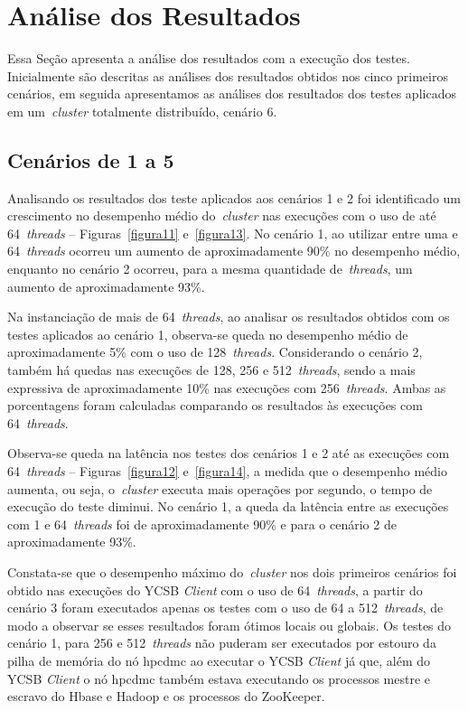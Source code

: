 \documentclass[12pt]{article}
\begin{document}
\section{Análise dos Resultados}
\label{sec:resultados}

Essa Seção apresenta a análise dos resultados com a execução dos testes. Inicialmente são descritas as análises dos resultados obtidos nos cinco primeiros cenários, em seguida apresentamos as análises dos resultados dos testes aplicados em um~\emph{cluster} totalmente distribuído, cenário 6.

\subsection{Cenários de 1 a 5}

Analisando os resultados dos teste aplicados aos cenários 1 e 2 foi identificado um crescimento no desempenho médio do~\emph{cluster} nas execuções com o uso de até 64~\emph{threads} -- Figuras~\ref{figura11} e~\ref{figura13}. 
No cenário 1, ao utilizar entre uma e 64~\emph{threads} ocorreu um aumento de aproximadamente 90\% no desempenho médio, enquanto no cenário 2 ocorreu, para a mesma quantidade de~\emph{threads}, um aumento de aproximadamente 93\%.

Na instanciação de mais de 64~\emph{threads}, ao analisar os resultados obtidos com os testes aplicados ao cenário 1, observa-se queda no desempenho médio de aproximadamente 5\% com o uso de 128~\emph{threads}. Considerando o cenário 2, também há quedas nas execuções de 128, 256 e 512~\emph{threads}, sendo a mais expressiva de aproximadamente 10\% nas execuções com 256~\emph{threads}. 
Ambas as porcentagens foram calculadas comparando os resultados às execuções com 64~\emph{threads}.

Observa-se queda na latência nos testes dos cenários 1 e 2 até as execuções com 64~\emph{threads} -- Figuras~\ref{figura12} e~\ref{figura14}, a medida que o desempenho médio aumenta, ou seja, o~\emph{cluster} executa mais operações por segundo, o tempo de execução do teste diminui. No cenário 1, a queda da latência entre as execuções com 1 e 64~\emph{threads} foi de aproximadamente 90\% e para o cenário 2 de aproximadamente 93\%.

Constata-se que o desempenho máximo do~\emph{cluster} nos dois primeiros cenários foi obtido nas execuções do YCSB \textit{Client} com o uso de 64~\emph{threads}, a partir do cenário 3 foram executados apenas os testes com o uso de 64 a 512~\emph{threads}, de modo a observar se esses resultados foram ótimos locais ou globais. Os testes do cenário 1, para 256 e 512~\emph{threads} não puderam ser executados por estouro da pilha de memória do nó hpcdmc ao executar o YCSB \textit{Client} já que, além do YCSB \textit{Client} o nó hpcdmc também estava executando os processos mestre e escravo do Hbase e Hadoop e os processos do ZooKeeper.
\end{document}
